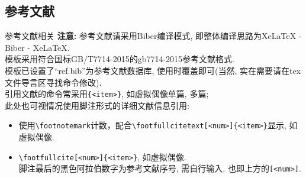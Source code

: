 \subsection{参考文献}
\begin{frame}[fragile]{参考文献相关}
	\textbf{注意:} 参考文献请采用{\color{scured}Biber}编译模式, 即整体编译思路为XeLaTeX - Biber - XeLaTeX.\\
	模板采用符合国标GB/T7714-2015的gb7714-2015参考文献格式.\\
	模板已设置了``ref.bib''为参考文献数据库, 使用时覆盖即可(当然, 实在需要请在tex文件导言区寻找命令修改).\\[1ex]
	引用文献的命令常采用\verb|{<item>}|, 如虚拟偶像单篇\cite{__2020-1}, 多篇\cite{__2016,m_possibilities_2018};\\
	此处也可视情况使用脚注形式的详细文献信息引用:
	\begin{itemize}
		\item 使用\verb|\footnotemark|计数，配合\verb|\footfullcitetext|\verb|[<num>]|\verb|{<item>}|显示, 如虚拟偶像\footnotemark.
		\item \verb|\footfullcite|\verb|[<num>]|\verb|{<item>}|, 如虚拟偶像.\\
		脚注最后的黑色阿拉伯数字为参考文献序号, 需自行输入, 也即上方的\verb|[<num>]|.
	\end{itemize}
\end{frame}

